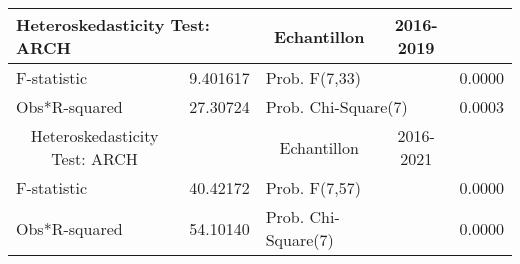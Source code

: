 \begin{tabular}{lrrrr}
\toprule
\multicolumn{2}{l}{Heteroskedasticity Test: ARCH}&\multicolumn{1}{c}{Echantillon}&\multicolumn{1}{c}{2016-2019}&\multicolumn{1}{c}{}\\
 \midrule 
\multicolumn{1}{l}{F-statistic}&\multicolumn{1}{r}{9.401617}&\multicolumn{2}{l}{Prob. F(7,33)}&\multicolumn{1}{r}{0.0000}\\
\multicolumn{1}{l}{Obs*R-squared}&\multicolumn{1}{r}{27.30724}&\multicolumn{2}{l}{Prob. Chi-Square(7)}&\multicolumn{1}{r}{0.0003}\\
 \toprule
\multicolumn{1}{c}{Heteroskedasticity Test: ARCH}&\multicolumn{1}{c}{}&\multicolumn{1}{c}{Echantillon}&\multicolumn{1}{c}{2016-2021}&\multicolumn{1}{c}{}\\
 \midrule
\multicolumn{1}{l}{F-statistic}&\multicolumn{1}{c}{40.42172}&\multicolumn{1}{l}{Prob. F(7,57)}&\multicolumn{1}{c}{}&\multicolumn{1}{c}{0.0000}\\
\multicolumn{1}{l}{Obs*R-squared}&\multicolumn{1}{c}{54.10140}&\multicolumn{1}{l}{Prob. Chi-Square(7)}&\multicolumn{1}{c}{}&\multicolumn{1}{c}{0.0000}\\
 \bottomrule
\end{tabular}